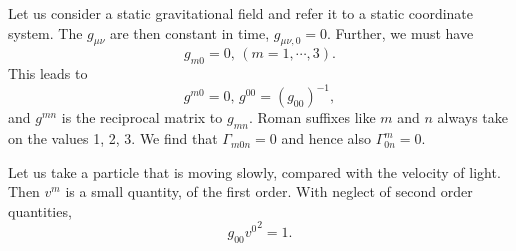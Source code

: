 Let us consider a static gravitational field and refer it to a static coordinate system. The $g_{\mu\nu}$ are then 
constant in time, $g_{\mu\nu,0} = 0$. Further, we must have 
\[
 g_{m0} = 0, \, \left( m=1,\cdots,3 \right) .
\]
This leads to
\[
 g^{m0} = 0, \, g^{00} = (g_{00})^{-1},
\]
and $g^{mn}$ is the reciprocal matrix to $g_{mn}$. Roman suffixes like $m$ and $n$ always take on the values 1, 2, 3. 
We find that $\Gamma_{m0n} = 0$ and hence also $\Gamma^{m}_{0n}=0$.

Let us take a particle that is moving slowly, compared with the velocity of light. Then $v^m$ is a small quantity, of 
the first order. With neglect of second order quantities,
\begin{equation}
 \label{ecuacion 16.1}
 g_{00} {v^{0}}^2 = 1.
\end{equation}
